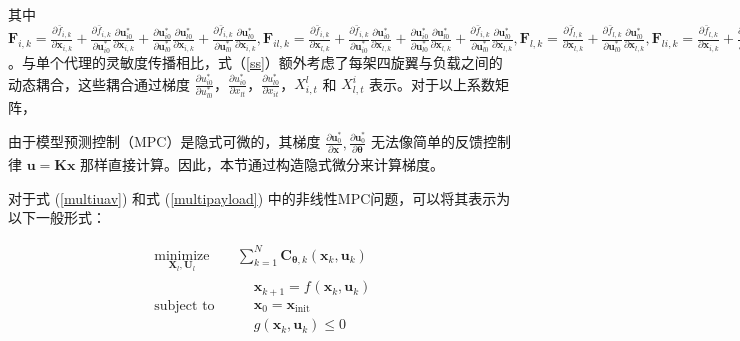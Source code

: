 \documentclass[lang=chs, degree=master, blindreview=true, winfonts=true]{yanputhesis}
\begin{document}
其中
\(
\bm{F}_{i,k} = \frac{\partial \bar{f}_{i,k}}{\partial \bm{x}_{i,k}} + \frac{\partial \bar{f}_{i,k}}{\partial \bm{u}_{i0}^*} \frac{\partial \bm{u}_{i0}^*}{\partial \bm{x}_{i,k}} + \frac{\partial \bm{u}_{i0}^*}{\partial \bm{u}_{l0}^*} \frac{\partial \bm{u}_{l0}^*}{\partial \bm{x}_{i,k}} + \frac{\partial \bar{f}_{i,k}}{\partial \bm{u}_{l0}^*} \frac{\partial \bm{u}_{l0}^*}{\partial \bm{x}_{i,k}}
,
\bm{F}_{il,k} = \frac{\partial \bar{f}_{i,k}}{\partial \bm{x}_{l,k}} + \frac{\partial \bar{f}_{i,k}}{\partial \bm{u}_{i0}^*} \frac{\partial \bm{u}_{i0}^*}{\partial \bm{x}_{l,k}} + \frac{\partial \bm{u}_{i0}^*}{\partial \bm{u}_{l0}^*} \frac{\partial \bm{u}_{l0}^*}{\partial \bm{x}_{l,k}} + \frac{\partial \bar{f}_{i,k}}{\partial \bm{u}_{l0}^*} \frac{\partial \bm{u}_{l0}^*}{\partial \bm{x}_{l,k}}
,
\bm{F}_{l,k} = \frac{\partial \bar{f}_{l,k}}{\partial \bm{x}_{l,k}} + \frac{\partial \bar{f}_{l,k}}{\partial \bm{u}_{l0}^*} \frac{\partial \bm{u}_{l0}^*}{\partial \bm{x}_{l,k}}
,
\bm{F}_{li,k} = \frac{\partial \bar{f}_{l,k}}{\partial \bm{x}_{i,k}} + \frac{\partial \bar{f}_{l,k}}{\partial \bm{u}_{l0}^*} \frac{\partial \bm{u}_{l0}^*}{\partial \bm{x}_{i,k}}
,
\bm{G}_{i,k} = \frac{\partial \bar{f}_{i,k}}{\partial \bm{u}_{i0}^*}
,
\bm{G}_{il,k} = \frac{\partial \bar{f}_{i,k}}{\partial \bm{u}_{i0}^*} \frac{\partial \bm{u}_{i0}^*}{\partial \bm{u}_{l0}^*} + \frac{\partial \bar{f}_{i,k}}{\partial \bm{u}_{l0}^*}
,
\bm{G}_{l,k} = \frac{\partial \bar{f}_{l,k}}{\partial \bm{u}_{l0}^*}
,
\bm{U}_{i,k} = \frac{\partial \bm{u}_{i0}^*}{\partial \bm{\theta}_i}, \quad \bm{U}_{l,k} = \frac{\partial \bm{u}_{l0}^*}{\partial \bm{\theta}_l}
\)。与单个代理的灵敏度传播相比，式（\ref{ss}）额外考虑了每架四旋翼与负载之间的动态耦合，这些耦合通过梯度 \( \frac{\partial u_{i0}^*}{\partial u_{l0}^*} \)，\( \frac{\partial u_{i0}^*}{\partial x_{lt}} \)，\( \frac{\partial u_{l0}^*}{\partial x_{it}} \)，\( X_{i,t}^l \) 和 \( X_{l,t}^i \) 表示。对于以上系数矩阵，


由于模型预测控制（MPC）是隐式可微的，其梯度 \( \frac{\partial \bm u_{0}^*}{\partial \bm x_{}}, \frac{\partial \bm u_{0}^*}{\partial \bm \theta_{}} \) 无法像简单的反馈控制律 \( \bm u = \bm K \bm x \) 那样直接计算。因此，本节通过构造隐式微分来计算梯度。

对于式 (\ref{multiuav}) 和式 (\ref{multipayload}) 中的非线性MPC问题，可以将其表示为以下一般形式：

\begin{equation}
\begin{aligned} 
&\operatorname*{minimize}_{\bm{X}_l, \bm{U}_l} & &  \sum_{k=1}^N{\bm C}_{\bm \theta,k}(\bm x_k,\bm u_k) \\
&\text{subject to} & & \begin{aligned}
& \bm{x}_{k+1} ={f}_{}(\bm{x}_{k}, \bm{u}_{k}) \\
& \bm{x}_{0} = \bm{x}_\text{init}\\
& g(\bm x_k,\bm u_k) \leqslant 0	
\end{aligned}	
\end{aligned}
\label{NMPC}
\end{equation}
\end{document}
